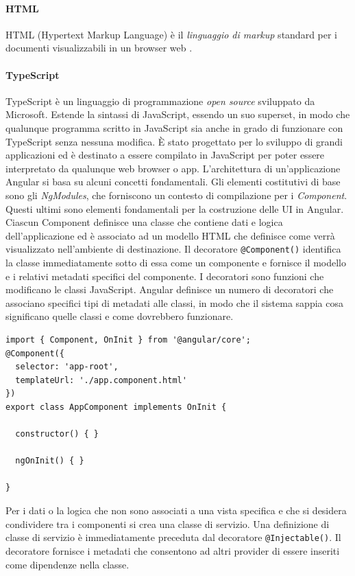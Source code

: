 \paragraph{HTML} HTML (Hypertext Markup Language) è il \textit{linguaggio di markup} standard per i documenti visualizzabili in un browser web \cite{HTML}.
\paragraph{TypeScript} TypeScript è un linguaggio di programmazione \textit{open source} sviluppato da Microsoft. Estende la sintassi di JavaScript, essendo un suo superset, in modo che qualunque programma scritto in JavaScript sia anche in grado di funzionare con TypeScript senza nessuna modifica. È stato progettato per lo sviluppo di grandi applicazioni ed è destinato a essere compilato in JavaScript per poter essere interpretato da qualunque web browser o app. \cite{TYPESCRIPT}
L'architettura di un'applicazione Angular si basa su alcuni concetti fondamentali. Gli elementi costitutivi di base sono gli \textit{NgModules}, che forniscono un contesto di compilazione per i \textit{Component}. Questi ultimi sono elementi fondamentali per la costruzione delle UI in Angular. Ciascun Component definisce una classe che contiene dati e logica dell'applicazione ed è associato ad un modello HTML che definisce come verrà visualizzato nell'ambiente di destinazione. Il decoratore \verb|@Component()| identifica la classe immediatamente sotto di essa come un componente e fornisce il modello e i relativi metadati specifici del componente.
I decoratori sono funzioni che modificano le classi JavaScript. Angular definisce un numero di decoratori che associano specifici tipi di metadati alle classi, in modo che il sistema sappia cosa significano quelle classi e come dovrebbero funzionare.\cite{ANGULAR}
\begin{lstlisting}[caption={Esempio di un Component in Angular}, style=javaScriptCode]
import { Component, OnInit } from '@angular/core';
@Component({
  selector: 'app-root',
  templateUrl: './app.component.html'
})
export class AppComponent implements OnInit {

  constructor() { }

  ngOnInit() { }

}
\end{lstlisting}
Per i dati o la logica che non sono associati a una vista specifica e che si desidera condividere tra i componenti si crea una classe di servizio. Una definizione di classe di servizio è immediatamente preceduta dal decoratore \verb|@Injectable()|. Il decoratore fornisce i metadati che consentono ad altri provider di essere inseriti come dipendenze nella classe.
